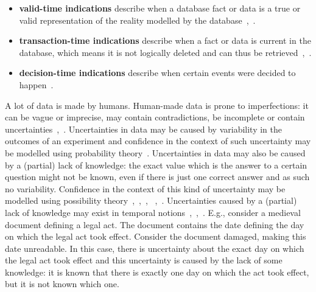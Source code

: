 \documentclass[runningheads,a4paper]{llncs}
\begin{document}
\begin{itemize}
	\item \textbf{valid-time indications} describe when a database fact or data is a true or valid representation of the reality modelled by the database~\cite{Dyreson1994sigmod},~\cite{Bohlen1998lncs}.
	\item \textbf{transaction-time indications} describe when a fact or data is current in the database, which means it is not logically deleted and can thus be retrieved~\cite{Dyreson1994sigmod},~\cite{Bohlen1998lncs}.
	\item \textbf{decision-time indications} describe when certain events were decided to happen~\cite{Nascimento1995siwtrr}.
\end{itemize}

A lot of data is made by humans. Human-made data is prone to imperfections: it can be vague or imprecise, may contain contradictions, be incomplete or contain uncertainties~\cite{Pons2012ipmu},~\cite{Pons2012ijcis}. Uncertainties in data may be caused by variability in the outcomes of an experiment and confidence in the context of such uncertainty may be modelled using probability theory~\cite{Pons2013ijufkbs}. Uncertainties in data may also be caused by a (partial) lack of knowledge: the exact value which is the answer to a certain question might not be known, even if there is just one correct answer and as such no variability. Confidence in the context of this kind of uncertainty may be modelled using possibility theory~\cite{Zadeh1978fss},~\cite{Dubois1988},~\cite{Pons2013ijufkbs}, ~\cite{Pons2012ipmu},~\cite{Pons2012ijcis}. Uncertainties caused by a (partial) lack of knowledge may exist in temporal notions~\cite{Pons2012ijcis},~\cite{Pons2012ipmu},~\cite{Pons2013ijufkbs}. E.g., consider a medieval document defining a legal act. The document contains the date defining the day on which the legal act took effect. Consider the document damaged, making this date unreadable. In this case, there is uncertainty about the exact day on which the legal act took effect and this uncertainty is caused by the lack of some knowledge: it is known that there is exactly one day on which the act took effect, but it is not known which one.
\end{document}
